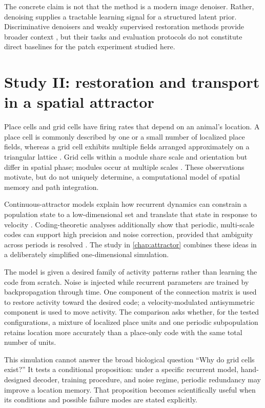 The concrete claim is not that the method is a modern image denoiser. Rather, denoising supplies a tractable learning signal for a structured latent prior. Discriminative denoisers and weakly supervised restoration methods provide broader context \citep{zhang17,lehtinen18}, but their tasks and evaluation protocols do not constitute direct baselines for the patch experiment studied here.

\section{Study II: restoration and transport in a spatial attractor}
\label{sec:intro-attractor}

Place cells and grid cells have firing rates that depend on an animal's location. A place cell is commonly described by one or a small number of localized place fields, whereas a grid cell exhibits multiple fields arranged approximately on a triangular lattice \citep{oj71,ht05}. Grid cells within a module share scale and orientation but differ in spatial phase; modules occur at multiple scales \citep{sh12,me14}. These observations motivate, but do not uniquely determine, a computational model of spatial memory and path integration.

Continuous-attractor models explain how recurrent dynamics can constrain a population state to a low-dimensional set and translate that state in response to velocity \citep{ss02,by09}. Coding-theoretic analyses additionally show that periodic, multi-scale codes can support high precision and noise correction, provided that ambiguity across periods is resolved \citep{ss11,wei15,stemmler15}. The study in \cref{chap:attractor} combines these ideas in a deliberately simplified one-dimensional simulation.

The model is given a desired family of activity patterns rather than learning the code from scratch. Noise is injected while recurrent parameters are trained by backpropagation through time. One component of the connection matrix is used to restore activity toward the desired code; a velocity-modulated antisymmetric component is used to move activity. The comparison asks whether, for the tested configurations, a mixture of localized place units and one periodic subpopulation retains location more accurately than a place-only code with the same total number of units.

This simulation cannot answer the broad biological question ``Why do grid cells exist?'' It tests a conditional proposition: under a specific recurrent model, hand-designed decoder, training procedure, and noise regime, periodic redundancy may improve a location memory. That proposition becomes scientifically useful when its conditions and possible failure modes are stated explicitly.

